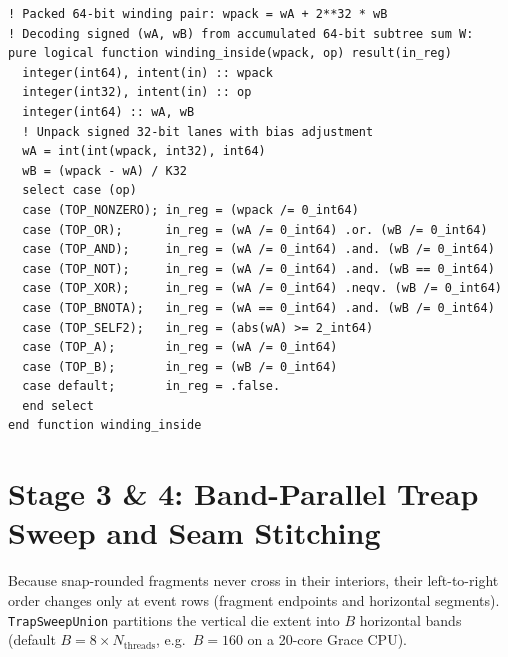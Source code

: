 \begin{lstlisting}[caption={Packed two-operand winding and region-predicate evaluation in \texttt{src/trap\_merge.f90}.},label={lst:wpack}]
! Packed 64-bit winding pair: wpack = wA + 2**32 * wB
! Decoding signed (wA, wB) from accumulated 64-bit subtree sum W:
pure logical function winding_inside(wpack, op) result(in_reg)
  integer(int64), intent(in) :: wpack
  integer(int32), intent(in) :: op
  integer(int64) :: wA, wB
  ! Unpack signed 32-bit lanes with bias adjustment
  wA = int(int(wpack, int32), int64)
  wB = (wpack - wA) / K32
  select case (op)
  case (TOP_NONZERO); in_reg = (wpack /= 0_int64)
  case (TOP_OR);      in_reg = (wA /= 0_int64) .or. (wB /= 0_int64)
  case (TOP_AND);     in_reg = (wA /= 0_int64) .and. (wB /= 0_int64)
  case (TOP_NOT);     in_reg = (wA /= 0_int64) .and. (wB == 0_int64)
  case (TOP_XOR);     in_reg = (wA /= 0_int64) .neqv. (wB /= 0_int64)
  case (TOP_BNOTA);   in_reg = (wA == 0_int64) .and. (wB /= 0_int64)
  case (TOP_SELF2);   in_reg = (abs(wA) >= 2_int64)
  case (TOP_A);       in_reg = (wA /= 0_int64)
  case (TOP_B);       in_reg = (wB /= 0_int64)
  case default;       in_reg = .false.
  end select
end function winding_inside
\end{lstlisting}

\section{Stage 3 \& 4: Band-Parallel Treap Sweep and Seam Stitching}

Because snap-rounded fragments never cross in their interiors, their left-to-right order changes only at event rows (fragment endpoints and horizontal segments). \texttt{TrapSweepUnion} partitions the vertical die extent into $B$ horizontal bands (default $B = 8 \times N_{\text{threads}}$, e.g.\ $B = 160$ on a 20-core Grace CPU).


